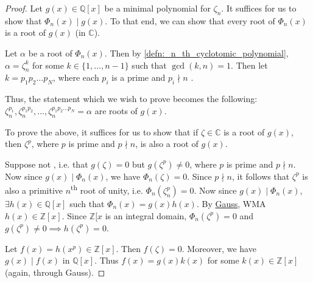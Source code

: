 \documentclass[notoc,notitlepage,nobib]{tufte-book}
\begin{document}
\begin{proof}
  Let $g(x) \in \mathbb{Q}[x]$ be a minimal polynomial for $\zeta_n$. It suffices for us to
  show that $\Phi_n(x) \mid g(x)$. To that end, we can show that every root of $\Phi_n(x)$
  is a root of $g(x)$ (in $\mathbb{C}$).

  Let $\alpha$ be a root of $\Phi_n(x)$. Then by \cref{defn:_n_th_cyclotomic_polynomial},
  $\alpha = \zeta_n^k$ for some $k \in \{ 1, \ldots, n - 1 \}$ such that $\gcd(k, n) = 1$.
  Then let $k = p_1 p_2 \hdots p_N$, where each $p_i$ is a prime and $p_i \nmid n$
  .
  
  Thus, the statement which we wish to prove becomes the following: $\zeta_n^{p_1},
  \zeta_n^{p_1 p_2}, \ldots, \zeta_n^{p_1 p_2 \hdots p_N} = \alpha$ are roots of $g(x)$.

  To prove the above, it suffices for us to show that if $\zeta \in \mathbb{C}$ is a root of
  $g(x)$, then $\zeta^p$, where $p$ is prime and $p \nmid n$, is also a root of $g(x)$.

  Suppose not \faDizzy, i.e. that $g(\zeta) = 0$ but $g\left(\zeta^p\right) \neq 0$, where $p$
  is prime and $p \nmid n$. Now since $g(x) \mid \Phi_n(x)$, we have
  $\Phi_n(\zeta) = 0$. Since $p \nmid n$, it follows that $\zeta^p$ is also a
  primitive $n$\textsuperscript{th} root of unity, i.e. $\Phi_n(\zeta_n^p) = 0$.
  Now since $g(x) \mid \Phi_n(x)$, $\exists h(x) \in \mathbb{Q}[x]$ such that
  $\Phi_n(x) =g(x) h(x)$. By \hyperref[thm:gauss_lemma]{Gauss}, WMA $h(x) \in
  \mathbb{Z}[x]$. Since $\mathbb{Z}[x$ is an integral domain, $\Phi_n(\zeta^p) =
  0$ and $g(\zeta^p) \neq 0 \implies h(\zeta^p) = 0$.

  Let $f(x) = h(x^p) \in \mathbb{Z}[x]$. Then $f(\zeta) = 0$. Moreover, we have $g(x) \mid
  f(x)$ in $\mathbb{Q}[x]$. Thus $f(x) = g(x) k(x)$ for some $k(x) \in \mathbb{Z}[x]$
  (again, through Gauss).


\end{proof}
\end{document}
